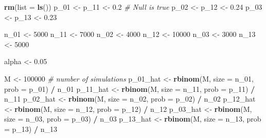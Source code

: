 \documentclass[
]{article}
\newenvironment{Shaded}{\begin{snugshade}}{\end{snugshade}}
\newcommand{\CommentTok}[1]{\textcolor[rgb]{0.56,0.35,0.01}{\textit{#1}}}
\newcommand{\DataTypeTok}[1]{\textcolor[rgb]{0.13,0.29,0.53}{#1}}
\newcommand{\DecValTok}[1]{\textcolor[rgb]{0.00,0.00,0.81}{#1}}
\newcommand{\FloatTok}[1]{\textcolor[rgb]{0.00,0.00,0.81}{#1}}
\newcommand{\KeywordTok}[1]{\textcolor[rgb]{0.13,0.29,0.53}{\textbf{#1}}}
\newcommand{\NormalTok}[1]{#1}
\newcommand{\OperatorTok}[1]{\textcolor[rgb]{0.81,0.36,0.00}{\textbf{#1}}}
\newcommand{\StringTok}[1]{\textcolor[rgb]{0.31,0.60,0.02}{#1}}
\begin{document}
\begin{Shaded}
\begin{Highlighting}[]
\KeywordTok{rm}\NormalTok{(}\DataTypeTok{list =} \KeywordTok{ls}\NormalTok{())}
\NormalTok{p_}\DecValTok{01}\NormalTok{ <-}\StringTok{ }\NormalTok{p_}\DecValTok{11}\NormalTok{ <-}\StringTok{ }\FloatTok{0.2} \CommentTok{# Null is true}
\NormalTok{p_}\DecValTok{02}\NormalTok{ <-}\StringTok{ }\NormalTok{p_}\DecValTok{12}\NormalTok{ <-}\StringTok{ }\FloatTok{0.24}
\NormalTok{p_}\DecValTok{03}\NormalTok{ <-}\StringTok{ }\NormalTok{p_}\DecValTok{13}\NormalTok{ <-}\StringTok{ }\FloatTok{0.23}

\NormalTok{n_}\DecValTok{01}\NormalTok{ <-}\StringTok{ }\DecValTok{5000}
\NormalTok{n_}\DecValTok{11}\NormalTok{ <-}\StringTok{ }\DecValTok{7000}
\NormalTok{n_}\DecValTok{02}\NormalTok{ <-}\StringTok{ }\DecValTok{4000}
\NormalTok{n_}\DecValTok{12}\NormalTok{ <-}\StringTok{ }\DecValTok{10000}
\NormalTok{n_}\DecValTok{03}\NormalTok{ <-}\StringTok{ }\DecValTok{3000}
\NormalTok{n_}\DecValTok{13}\NormalTok{ <-}\StringTok{ }\DecValTok{5000}

\NormalTok{alpha <-}\StringTok{ }\FloatTok{0.05}

\NormalTok{M <-}\StringTok{ }\DecValTok{100000} \CommentTok{# number of simulations}
\NormalTok{p_}\DecValTok{01}\NormalTok{_hat <-}\StringTok{ }\KeywordTok{rbinom}\NormalTok{(M, }\DataTypeTok{size =}\NormalTok{ n_}\DecValTok{01}\NormalTok{, }\DataTypeTok{prob =}\NormalTok{ p_}\DecValTok{01}\NormalTok{) }\OperatorTok{/}\StringTok{ }\NormalTok{n_}\DecValTok{01}
\NormalTok{p_}\DecValTok{11}\NormalTok{_hat <-}\StringTok{ }\KeywordTok{rbinom}\NormalTok{(M, }\DataTypeTok{size =}\NormalTok{ n_}\DecValTok{11}\NormalTok{, }\DataTypeTok{prob =}\NormalTok{ p_}\DecValTok{11}\NormalTok{) }\OperatorTok{/}\StringTok{ }\NormalTok{n_}\DecValTok{11}
\NormalTok{p_}\DecValTok{02}\NormalTok{_hat <-}\StringTok{ }\KeywordTok{rbinom}\NormalTok{(M, }\DataTypeTok{size =}\NormalTok{ n_}\DecValTok{02}\NormalTok{, }\DataTypeTok{prob =}\NormalTok{ p_}\DecValTok{02}\NormalTok{) }\OperatorTok{/}\StringTok{ }\NormalTok{n_}\DecValTok{02}
\NormalTok{p_}\DecValTok{12}\NormalTok{_hat <-}\StringTok{ }\KeywordTok{rbinom}\NormalTok{(M, }\DataTypeTok{size =}\NormalTok{ n_}\DecValTok{12}\NormalTok{, }\DataTypeTok{prob =}\NormalTok{ p_}\DecValTok{12}\NormalTok{) }\OperatorTok{/}\StringTok{ }\NormalTok{n_}\DecValTok{12}
\NormalTok{p_}\DecValTok{03}\NormalTok{_hat <-}\StringTok{ }\KeywordTok{rbinom}\NormalTok{(M, }\DataTypeTok{size =}\NormalTok{ n_}\DecValTok{03}\NormalTok{, }\DataTypeTok{prob =}\NormalTok{ p_}\DecValTok{03}\NormalTok{) }\OperatorTok{/}\StringTok{ }\NormalTok{n_}\DecValTok{03}
\NormalTok{p_}\DecValTok{13}\NormalTok{_hat <-}\StringTok{ }\KeywordTok{rbinom}\NormalTok{(M, }\DataTypeTok{size =}\NormalTok{ n_}\DecValTok{13}\NormalTok{, }\DataTypeTok{prob =}\NormalTok{ p_}\DecValTok{13}\NormalTok{) }\OperatorTok{/}\StringTok{ }\NormalTok{n_}\DecValTok{13}


\end{Highlighting}
\end{Shaded}
\end{document}
